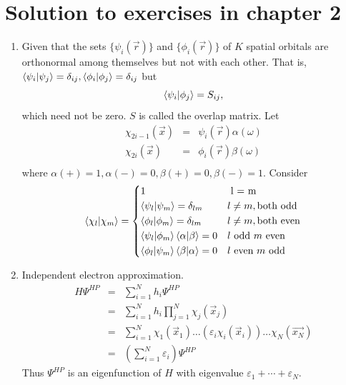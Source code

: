 \chapter{Solution to exercises in chapter 2}
\begin{enumerate}
\item\label{c2p1} Given that the sets $\{\psi_i(\vec{r})\}$ and 
$\{\phi_i(\vec{r})\}$ of $K$ spatial orbitals are orthonormal among themselves 
but not with each other. That is, $\braket{\psi_i|\psi_j} = 
\delta_{ij}, \braket{\phi_i|\phi_j} = \delta_{ij}$ but
\[
\braket{\psi_i|\phi_j} = S_{ij},
\]
which need not be zero. $S$ is called the overlap matrix. Let
\begin{eqnarray*}
\chi_{2i-1}(\vec{x}) &=& \psi_i(\vec{r})\alpha(\omega) \\
\chi_{2i}(\vec{x}) &=& \phi_i(\vec{r})\beta(\omega) \\
\end{eqnarray*}
where $\alpha(+) = 1, \alpha(-) = 0, \beta(+) = 0, \beta(-) = 1$. Consider
\begin{equation}\label{c2pe1}
\braket{\chi_l|\chi_m} = \begin{dcases}
1 & \text{ l = m } \\
\braket{\psi_l|\psi_m} = \delta_{lm} & l \ne m, \text{both odd} \\
\braket{\phi_l|\phi_m} = \delta_{lm} & l \ne m, \text{both even} \\
\braket{\psi_l|\phi_m}\braket{\alpha|\beta} = 0 & l\text{ odd }m\text{ even} \\
\braket{\phi_l|\psi_m}\braket{\beta|\alpha} = 0 & l\text{ even }m\text{ odd}
\end{dcases}
\end{equation}

\item\label{c2p2} Independent electron approximation.
\begin{eqnarray*}
H\Psi^{HP} &=& \sum_{i=1}^N h_i\Psi^{HP} \\
 &=& \sum_{i=1}^N h_i\prod_{j=1}^N\chi_j(\vec{x}_j) \\
 &=& \sum_{i=1}^N \chi_1(\vec{x}_1)\ldots (\varepsilon_i\chi_i(\vec{x}_i))\ldots
 \chi_N(\vec{x_N}) \\
 &=& \left(\sum_{i=1}^N\varepsilon_i\right)\Psi^{HP}
\end{eqnarray*}
Thus $\Psi^{HP}$ is an eigenfunction of $H$ with eigenvalue $\varepsilon_1 + 
\cdots + \varepsilon_N$.


\end{enumerate}
